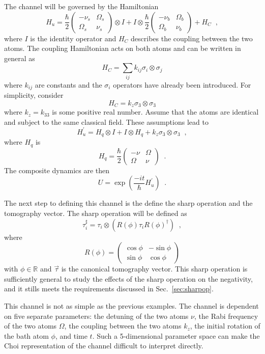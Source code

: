 The channel will be governed by the Hamiltonian
$$
H_u = \frac{\hbar}{2}\begin{pmatrix}
-\nu_s & \Omega_s\\
\Omega_s & \nu_s
\end{pmatrix}\otimes I + I\otimes \frac{\hbar}{2}\begin{pmatrix}
-\nu_b & \Omega_b\\
\Omega_b & \nu_b
\end{pmatrix} + H_C\;\;,
$$
where $I$ is the identity operator and $H_C$ describes the coupling between the two atoms.  The coupling Hamiltonian acts on both atoms and can be written in general as
$$
H_C = \sum_{ij} k_{ij} \sigma_i\otimes \sigma_j
$$
where $k_{ij}$ are constants and the $\sigma_i$ operators have already been introduced.  For simplicity, consider 
$$
H_C = k_z \sigma_3\otimes\sigma_3
$$
where $k_z=k_{33}$ is some positive real number.  Assume that the atoms are identical and subject to the same classical field.  These assumptions lead to
\begin{equation}
\label{eqn:hu}
H_u^\prime = H_q\otimes I + I\otimes H_q + k_z\sigma_3\otimes\sigma_3\;\;,
\end{equation}
where $H_q$ is 
$$
H_q = \frac{\hbar}{2}\begin{pmatrix}
-\nu & \Omega\\
\Omega & \nu
\end{pmatrix}\;\;.
$$
The composite dynamics are then
$$
U = \exp\left(\frac{-it}{\hbar}H_u^\prime\right)\;\;.
$$
 
The next step to defining this channel is the define the sharp operation and the tomography vector.  The sharp operation will be defined as
\begin{equation}
\tau_i^\sharp = \tau_i\otimes\left(R(\phi)\tau_iR(\phi)^\dagger\right)\;\;,
 \end{equation}
where 
\begin{equation}
R(\phi) = \begin{pmatrix}
\cos{\phi}&-\sin{\phi}\\
\sin{\phi}&\cos{\phi}
\end{pmatrix}
\end{equation}
with $\phi\in\mathbb{R}$ and $\vec{\tau}$ is the canonical tomography vector.  This sharp operation is sufficiently general to study the effects of the sharp operation on the negativity, and it stills meets the requirements discussed in Sec.\ \ref{sec:sharpop}.  
 
This channel is not as simple as the previous examples.  The channel is dependent on five separate parameters: the detuning of the two atoms $\nu$, the Rabi frequency of the two atoms $\Omega$, the coupling between the two atoms $k_z$, the initial rotation of the bath atom $\phi$, and time $t$.  Such a 5-dimensional parameter space can make the Choi representation of the channel difficult to interpret directly.    

